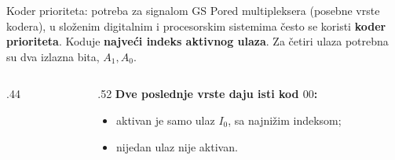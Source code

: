 \begin{frame}[t,label=03-s016]{Koder prioriteta: potreba za signalom GS}
\setlength{\parskip}{0pt}
Pored multipleksera (posebne vrste kodera), u složenim digitalnim
i procesorskim sistemima često se koristi \textbf{koder prioriteta}. Koduje \textbf{najveći indeks aktivnog ulaza}.
Za četiri ulaza potrebna su dva izlazna bita, \(A_1,A_0\).
\par\vspace{2mm}
\begin{columns}[c,onlytextwidth]
\begin{column}{.44\textwidth}\centering
{}
\par\vspace{1.5mm}
{\fontsize{10}{12}\selectfont}
\end{column}
\begin{column}{.52\textwidth}
\textbf{Dve poslednje vrste daju isti kod \(00\):}
\begin{itemize}
\item aktivan je samo ulaz \(I_0\), sa najnižim indeksom;
\item nijedan ulaz nije aktivan.
\end{itemize}
\par\vspace{1mm}
\end{column}
\end{columns}
\end{frame}
